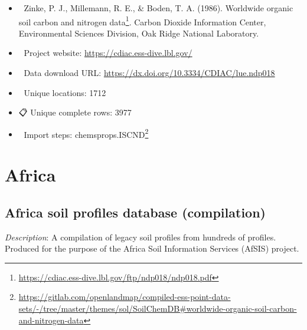 \documentclass[
  graybox,natbib,nospthms]{svmono}
\providecommand{\tightlist}{%
  \setlength{\itemsep}{0pt}\setlength{\parskip}{0pt}}
\providecommand{\tightlist}{\setlength{\itemsep}{0pt}\setlength{\parskip}{0pt}}
\renewcommand{\href}[2]{#2 (\url{#1})}
\renewcommand{\href}[2]{#2\footnote{\url{#1}}}
\begin{document}
\begin{itemize}
\tightlist
\item
  📕 Zinke, P. J., Millemann, R. E., \& Boden, T. A. (1986). \href{https://cdiac.ess-dive.lbl.gov/ftp/ndp018/ndp018.pdf}{Worldwide organic soil carbon and nitrogen data}. Carbon Dioxide Information Center, Environmental Sciences Division, Oak Ridge National Laboratory.\\
\item
  🔗 Project website: \url{https://cdiac.ess-dive.lbl.gov/}\\
\item
  📂 Data download URL: \url{https://dx.doi.org/10.3334/CDIAC/lue.ndp018}\\
\item
  📍 Unique locations: 1712\\
\item
  📋 Unique complete rows: 3977\\
\item
  📝 Import steps: \href{https://gitlab.com/openlandmap/compiled-ess-point-data-sets/-/tree/master/themes/sol/SoilChemDB\#worldwide-organic-soil-carbon-and-nitrogen-data}{chemsprops.ISCND}
\end{itemize}

\hypertarget{africa}{%
\section{Africa}\label{africa}}

\hypertarget{africa-soil-profiles-database-compilation}{%
\subsection{Africa soil profiles database (compilation)}\label{africa-soil-profiles-database-compilation}}

\emph{Description}: A compilation of legacy soil profiles from hundreds of profiles.
Produced for the purpose of the Africa Soil Information Services (AfSIS) project.
\end{document}
